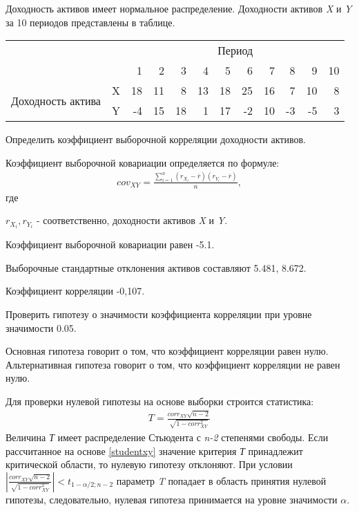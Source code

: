 \documentclass[12pt, table, twoside, a4paper]{exam}
\begin{document}
\begin{questions}
\question[20] Доходность активов имеет нормальное распределение. Доходности активов \textit{X} и \textit{Y} за 10 периодов представлены в таблице.
\begin{table}[htbp]
	\centering
	\begin{tabular}{llrrrrrrrrrr}
		\multicolumn{2}{c}{\multirow{2}[1]{*}{}} & \multicolumn{10}{c}{Период} \\\cmidrule{3-12}
		\multicolumn{2}{c}{} & 1     & 2     & 3     & 4     & 5     & 6     & 7     & 8     & 9     & 10 \\
		\midrule
		\multicolumn{1}{l}{\multirow{2}[1]{*}{Доходность актива}} & X     & 18    & 11    & 8     & 13    & 18    & 25    & 16    & 7     & 10    & 8 \\
		& Y     & -4    & 15    & 18    & 1     & 17    & -2    & 10    & -3    & -5    & 3 \\
	\end{tabular}%
	\label{tab:addlabel}%
\end{table}%
\noaddpoints
\begin{subparts}
	\subpart[10] Определить коэффициент выборочной корреляции доходности активов.
	
	\begin{solution}[6em]
		Коэффициент выборочной ковариации  определяется по формуле:
		\begin{align*}
		cov_{XY}=\frac{\sum_{i=1}^n \left(r_{X_i}-\overline{r} \right)\left(r_{Y_i}-\overline{r} \right)}{n},
		\end{align*}
		где 
		
		$r_{X_i}, r_{Y_i}$ - соответственно, доходности активов \textit{X} и \textit{Y}.
		
		Коэффициент выборочной ковариации равен -5.1.
		
		Выборочные стандартные отклонения активов составляют 5.481, 8.672.
		
		Коэффициент корреляции -0,107.
	\end{solution}
	
	\subpart[10] Проверить гипотезу о значимости коэффициента корреляции при уровне значимости 0.05.
	
	\begin{solution}[6em]
		
		\raggedright
		Основная гипотеза говорит о том, что коэффициент корреляции равен нулю. Альтернативная гипотеза говорит о том, что коэффициент корреляции не равен нулю.
		
		Для проверки нулевой гипотезы на основе выборки строится статистика:
		\begin{align}
		\label{studentxy}
		T=\frac{corr_{XY}\sqrt{n-2}}{\sqrt{1-corr_{XY}^2}}
		\end{align}
		Величина \textit{Т} имеет распределение Стьюдента с \textit{n-2} степенями свободы. Если рассчитанное на основе \eqref{studentxy} значение критерия \textit{Т }принадлежит критической области, то нулевую гипотезу отклоняют. 
		При условии $\left|\frac{corr_{XY}\sqrt{n-2}}{\sqrt{1-corr_{XY}^2}}\right|<t_{1-\alpha/2;n-2}$ параметр \textit{T} попадает в область принятия нулевой гипотезы, следовательно, нулевая гипотеза принимается на уровне значимости $\alpha$.
		

\end{solution}
\end{subparts}
\end{questions}
\end{document}
